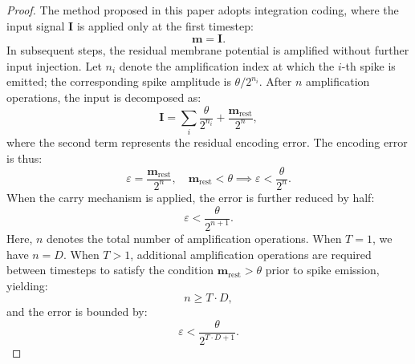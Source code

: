 \begin{proof}
The method proposed in this paper adopts integration coding, where the input signal $\mathbf{I}$ is applied only at the first timestep:
\[
\mathbf{m} = \mathbf{I}.
\]
In subsequent steps, the residual membrane potential is amplified without further input injection. Let $n_i$ denote the amplification index at which the $i$-th spike is emitted; the corresponding spike amplitude is $\theta / 2^{n_i}$. After $n$ amplification operations, the input is decomposed as:
\[
\mathbf{I} = \sum_{i} \frac{\theta}{2^{n_i}} + \frac{\mathbf{m}_{\text{rest}}}{2^{n}},
\]
where the second term represents the residual encoding error. The encoding error is thus:
\[
\varepsilon = \frac{\mathbf{m}_{\text{rest}}}{2^{n}}, \quad \mathbf{m}_{\text{rest}} < \theta \implies \varepsilon < \frac{\theta}{2^{n}}.
\]
When the carry mechanism is applied, the error is further reduced by half:
\[
\varepsilon < \frac{\theta}{2^{n+1}}.
\]
Here, $n$ denotes the total number of amplification operations. When $T = 1$, we have $n = D$. When $T > 1$, additional amplification operations are required between timesteps to satisfy the condition $\mathbf{m}_{\text{rest}} > \theta$ prior to spike emission, yielding:
\[
n \geq T \cdot D,
\]
and the error is bounded by:
\[
\varepsilon < \frac{\theta}{2^{T \cdot D + 1}}.
\]
\end{proof}





